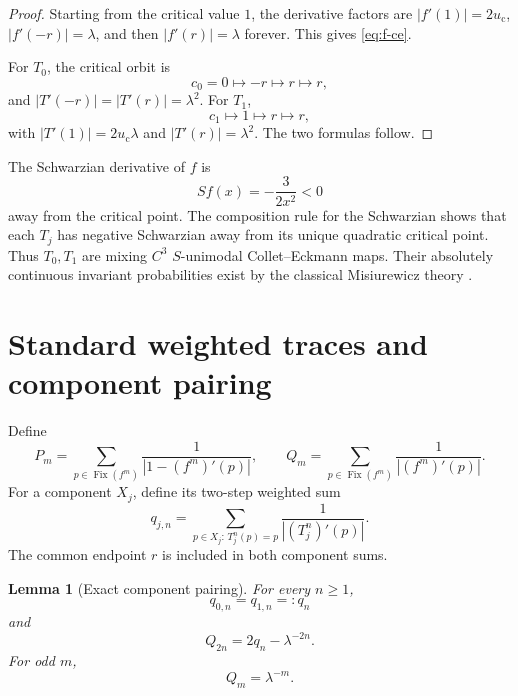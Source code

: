 \documentclass[11pt]{article}
\newtheorem{lemma}[theorem]{Lemma}
\theoremstyle{definition}
\theoremstyle{remark}
\newcommand{\uc}{u_{\mathrm c}}
\newcommand{\Fix}{\operatorname{Fix}}
\begin{document}
\begin{proof}
Starting from the critical value $1$, the derivative factors are
$|f'(1)|=2\uc$, $|f'(-r)|=\lambda$, and then $|f'(r)|=\lambda$ forever.  This
gives \eqref{eq:f-ce}.

For $T_0$, the critical orbit is
\begin{equation}\label{eq:central-critical-orbit}
 c_0=0\longmapsto-r\longmapsto r\longmapsto r,
\end{equation}
and $|T'(-r)|=|T'(r)|=\lambda^2$.  For $T_1$,
\begin{equation}\label{eq:high-critical-orbit}
 c_1\longmapsto1\longmapsto r\longmapsto r,
\end{equation}
with $|T'(1)|=2\uc\lambda$ and $|T'(r)|=\lambda^2$.  The two formulas follow.
\end{proof}

The Schwarzian derivative of $f$ is
\begin{equation}\label{eq:schwarzian}
 Sf(x)=-\frac{3}{2x^2}<0
\end{equation}
away from the critical point.  The composition rule for the Schwarzian shows
that each $T_j$ has negative Schwarzian away from its unique quadratic
critical point.  Thus $T_0,T_1$ are mixing $C^3$ $S$-unimodal
Collet--Eckmann maps.  Their absolutely continuous invariant probabilities
exist by the classical Misiurewicz theory
\citep{Misiurewicz1981,deMeloVanStrien1993,Young1992}.

\section{Standard weighted traces and component pairing}
\label{sec:weighted}

Define
\begin{equation}\label{eq:PQ}
 P_m=\sum_{p\in\Fix(f^m)}\frac1{|1-(f^m)'(p)|},
 \qquad
 Q_m=\sum_{p\in\Fix(f^m)}\frac1{|(f^m)'(p)|}.
\end{equation}
For a component $X_j$, define its two-step weighted sum
\begin{equation}\label{eq:component-q}
 q_{j,n}
 =\sum_{p\in X_j:\,T_j^n(p)=p}
 \frac1{|(T_j^n)'(p)|}.
\end{equation}
The common endpoint $r$ is included in both component sums.

\begin{lemma}[Exact component pairing]
\label{lem:component-pairing}
For every $n\ge1$,
\begin{equation}\label{eq:q-pairing}
 q_{0,n}=q_{1,n}=:q_n
\end{equation}
and
\begin{equation}\label{eq:Q-reconstruction}
 Q_{2n}=2q_n-\lambda^{-2n}.
\end{equation}
For odd $m$,
\begin{equation}\label{eq:Q-odd}
 Q_m=\lambda^{-m}.
\end{equation}
\end{lemma}
\end{document}
